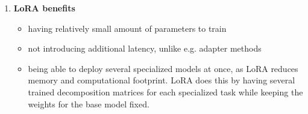 \begin{enumerate}
    \item \textbf{LoRA benefits}
    
    \begin{itemize}
        \item having relatively small amount of parameters to train
        \item not introducing additional latency, unlike e.g. adapter methods
        \item being able to deploy several specialized models at once, as LoRA reduces memory and computational footprint. LoRA does this by having several trained decomposition matrices for each specialized task while keeping the weights for the base model fixed.
    \end{itemize}
\end{enumerate}

